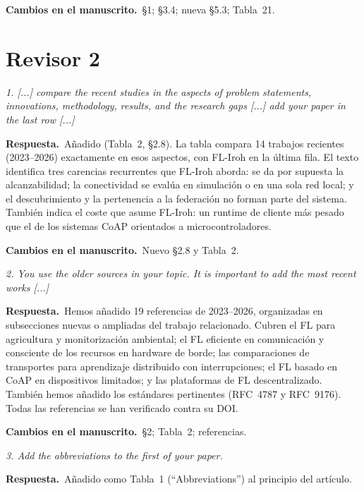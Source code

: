 \documentclass[11pt,a4paper]{article}
\newenvironment{comment}{\par\medskip\noindent\begin{minipage}{\linewidth}\color{blue!45!black}\itshape}{\end{minipage}\par}
\newcommand{\reply}{\par\smallskip\noindent\textbf{Respuesta.}~}
\newcommand{\changes}{\par\smallskip\noindent\textbf{Cambios en el manuscrito.}~}
\begin{document}
\changes \S1; \S3.4; nueva \S5.3; Tabla~21.

\section*{Revisor 2}

\begin{comment}
1. [...] compare the recent studies in the aspects of problem statements, innovations, methodology, results, and the research gaps [...] add your paper in the last row [...]
\end{comment}
\reply Añadido (Tabla~2, \S2.8). La tabla compara 14 trabajos recientes (2023--2026) exactamente en esos aspectos, con FL-Iroh en la última fila. El texto identifica tres carencias recurrentes que FL-Iroh aborda: se da por supuesta la alcanzabilidad; la conectividad se evalúa en simulación o en una sola red local; y el descubrimiento y la pertenencia a la federación no forman parte del sistema. También indica el coste que asume FL-Iroh: un runtime de cliente más pesado que el de los sistemas CoAP orientados a microcontroladores.

\changes Nuevo \S2.8 y Tabla~2.

\begin{comment}
2. You use the older sources in your topic. It is important to add the most recent works [...]
\end{comment}
\reply Hemos añadido 19 referencias de 2023--2026, organizadas en subsecciones nuevas o ampliadas del trabajo relacionado. Cubren el FL para agricultura y monitorización ambiental; el FL eficiente en comunicación y consciente de los recursos en hardware de borde; las comparaciones de transportes para aprendizaje distribuido con interrupciones; el FL basado en CoAP en dispositivos limitados; y las plataformas de FL descentralizado. También hemos añadido los estándares pertinentes (RFC~4787 y RFC~9176). Todas las referencias se han verificado contra su DOI.

\changes \S2; Tabla~2; referencias.

\begin{comment}
3. Add the abbreviations to the first of your paper.
\end{comment}
\reply Añadido como Tabla~1 (``Abbreviations'') al principio del artículo.
\end{document}

